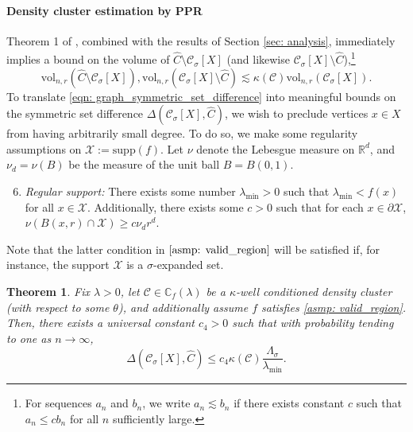 \documentclass{article}
\newcommand{\vol}{\mathrm{vol}}
\newcommand{\Reals}{\mathbb{R}}
\newcommand{\Rd}{\Reals^d}
\newcommand{\1}{\mathbf{1}}
\newcommand{\Xbf}{X}             %
\newcommand{\Cbb}{\mathbb{C}}
\newcommand{\Cset}{\mathcal{C}}
\newcommand{\Csig}{\Cset_{\sigma}}
\newcommand{\Cest}{\widehat{C}}
\newcommand{\ppr}{{\sc PPR}}
\theoremstyle{aldenthm}
\newtheorem{theorem}{Theorem}
\theoremstyle{aldenrmrk}
\begin{document}
\paragraph{Density cluster estimation by \ppr}

Theorem 1 of \cite{zhu2013}, combined with the results of Section \ref{sec: analysis}, immediately implies a bound on the volume of $\Cest \setminus \Csig[\Xbf]$ (and likewise $\Csig[\Xbf] \setminus \Cest$),\footnote{For sequences $a_n$ and $b_n$, we write $a_n \lesssim b_n$ if there exists constant $c$ such that $a_n \leq c b_n$ for all $n$ sufficiently large. }
\begin{equation}
\label{eqn: graph_symmetric_set_difference}
\vol_{n,r}(\Cest \setminus \Csig[\Xbf]), \vol_{n,r}(\Csig[\Xbf] \setminus \Cest) \lesssim \kappa(\Cset) \vol_{n,r}(\Csig[\Xbf]).
\end{equation}
To translate \eqref{eqn: graph_symmetric_set_difference} into meaningful bounds on the symmetric set difference $\Delta(\Csig[\Xbf], \Cest)$, we wish to preclude vertices $x \in \Xbf$ from having arbitrarily small degree. To do so, we make some regularity assumptions on $\mathcal{X} := \mathrm{supp}(f)$. Let $\nu$ denote the Lebesgue measure on $\Rd$, and $\nu_d = \nu(B)$ be the measure of the unit ball $B = B(0,1)$.
\begin{enumerate}[label=(A\arabic*)]
	\setcounter{enumi}{5}
	\item 
	\label{asmp: valid_region}
	\emph{Regular support:} There exists some number $\lambda_{\min} > 0$ such that $\lambda_{\min} < f(x)$ for all $x \in \mathcal{X}$. Additionally, there exists some $c > 0$ such that for each $x \in \partial \mathcal{X}$, $\nu(B(x,r) \cap \mathcal{X}) \geq c \nu_d r^d$.
\end{enumerate}
Note that the latter condition in $\ref{asmp: valid_region}$ will be satisfied if, for instance, the support $\mathcal{X}$ is a $\sigma$-expanded set.

\begin{theorem}
	\label{thm: misclassification_rate}
	Fix $\lambda > 0$, let $\Cset \in \Cbb_f(\lambda)$ be a $\kappa$-well conditioned density cluster (with respect to some $\theta$), and additionally assume $f$ satisfies \ref{asmp: valid_region}. Then, there exists a universal constant $c_4 > 0$ such that with probability tending to one as $n \to \infty$, 
	\begin{equation}
	\label{eqn: misclassification_rate_ub}
	\Delta(\Csig[\Xbf], \Cest) \leq c_4 \kappa(\Cset) \frac{\Lambda_{\sigma}}{\lambda_{\min}}.
	\end{equation}
\end{theorem}
\end{document}
